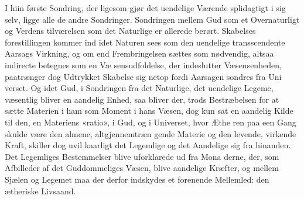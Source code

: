 \documentclass[12pt,a4paper]{book}
\begin{document}
I hiin første Sondring, der ligesom gjør det uendelige
%
%
Værende splidagtigt i sig selv, ligge alle de andre Sondringer.
Sondringen mellem Gud som et Overnaturligt og Verdens\-%
tilværelsen som det Naturlige er allerede berørt. Skabelses\-%
forestillingen kommer ind idet Naturen sees som den uendelige
transscendente Aarsags Virkning, og om end Frembringelsen
sættes som nødvendig, altsaa indirecte betegnes som en Væ\-%
sensudfoldelse, der indeslutter Væsensenheden, paatrænger dog
Udtrykket Skabelse sig netop fordi Aarsagen sondres fra Uni\-%
verset. Og idet Gud, i Sondringen fra det Naturlige, det
uendelige Legeme, væsentlig bliver en aandelig Enhed, saa
bliver der, trods Bestræbelsen for at sætte Materien i ham
som Moment i hans Væsen, dog kun sat en aandelig Kilde til
den, en Materiens «ratio», i Gud, og i Universet, hvor Æthe\-%
ren paa een Gang skulde være den almene, altgjennemtræn\-%
gende Materie og den levende, virkende Kraft, skiller dog uvil\-%
kaarligt det Legemlige og det Aandelige sig fra hinanden.
Det Legemliges Bestemmelser blive uforklarede ud fra Mona\-%
derne, der, som Afbilleder af det Guddommeliges Væsen, blive
aandelige Kræfter, og mellem Sjælen og Legemet maa der
derfor indskydes et forenende Mellemled: den ætheriske
Livsaand.
\end{document}
